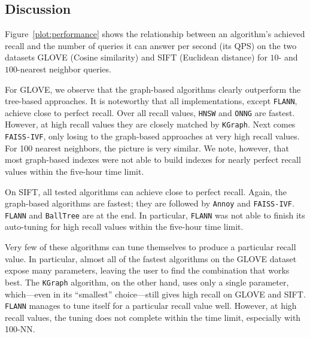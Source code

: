 \subsection{Discussion}

 Figure~\ref{plot:performance} shows the relationship between an algorithm's achieved recall and the number of queries it can answer per second (its QPS) on the two datasets \textsf{GLOVE} (Cosine similarity) and \textsf{SIFT} (Euclidean distance) for $10$- and $100$-nearest neighbor queries.

For \textsf{GLOVE}, we observe that the graph-based algorithms clearly outperform the tree-based approaches. It is noteworthy that all implementations, except \texttt{FLANN}, 
achieve close to perfect recall. Over all recall values, \texttt{HNSW} and \texttt{ONNG}
are fastest. However, at high recall values they are closely matched by \texttt{KGraph}. Next comes \texttt{FAISS-IVF}, only losing to the 
graph-based approaches at very high recall values. For 100 nearest neighbors, the picture is very similar. We note, however, that most
graph-based indexes were not able to build indexes for nearly perfect
recall values within the five-hour time limit.

On \textsf{SIFT}, all tested algorithms %
can achieve
close to perfect recall. Again,
the graph-based algorithms are fastest; they are followed by \texttt{Annoy} and
\texttt{FAISS-IVF}. \texttt{FLANN} and \texttt{BallTree} are at the end.
In particular, \texttt{FLANN} was not able to finish its auto-tuning for high
recall values within the five-hour time limit.

Very few of these algorithms can tune themselves to produce a particular recall
value. In particular, almost all of the fastest algorithms on the \textsf{GLOVE} dataset
expose many parameters, leaving the user to find the combination that works
best. The
\texttt{KGraph} algorithm, on the other hand, uses only a single parameter,
which---even in its ``smallest'' choice---still gives high recall on \textsf{GLOVE} and \textsf{SIFT}.
\texttt{FLANN} manages to tune itself for a particular recall value well. However, at 
high recall values, the tuning does not complete within the time
limit, especially with 100-NN.
%

\begin{figure}[t!]

\end{figure}

